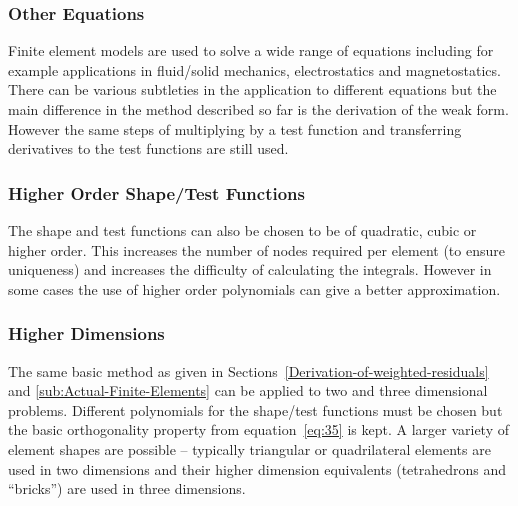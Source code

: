 \subsubsection{Other Equations}
\label{sec:fem-other-equations}

Finite element models are used to solve a wide range of equations including for example applications in fluid/solid mechanics, electrostatics and magnetostatics. There can be various subtleties in the application to different equations but the main difference in the method described so far is the derivation of the weak form. However the same steps of multiplying by a test function and transferring derivatives to the test functions are still used.


\subsubsection{Higher Order Shape/Test Functions}
\label{sec:fem-high-order-shap}

The shape and test functions can also be chosen to be of quadratic, cubic or higher order. This increases the number of nodes required per element (to ensure uniqueness) and increases the difficulty of calculating the integrals. However in some cases the use of higher order polynomials can give a better approximation.


\subsubsection{Higher Dimensions}
\label{sec:fem-higher-dimensions}

The same basic method as given in Sections~\ref{Derivation-of-weighted-residuals} and \ref{sub:Actual-Finite-Elements} can be applied to two and three dimensional problems. Different polynomials for the shape/test functions must be chosen but the basic orthogonality property from equation~\eqref{eq:35} is kept. A larger variety of element shapes are possible -- typically triangular or quadrilateral elements are used in two dimensions and their higher dimension equivalents (tetrahedrons and ``bricks'') are used in three dimensions.


